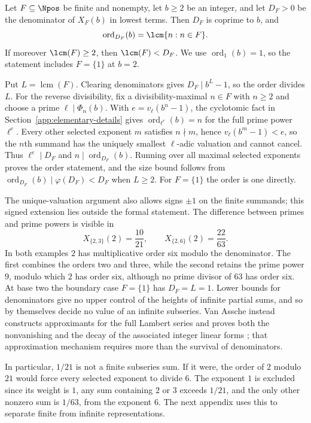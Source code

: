 \documentclass[11pt]{article}
\begin{document}
\begin{theorem}\label{res:period}
Let $F\subseteq\Npos$ be finite and nonempty, let $b\ge2$ be an integer, and
let $D_F>0$ be the denominator of $X_F(b)$ in lowest terms.  Then $D_F$ is
coprime to $b$, and
\[
  \operatorname{ord}_{D_F}(b)=\lcm\{n:n\in F\}.
\]
If moreover $\lcm(F)\ge2$, then $\lcm(F)<D_F$.  We use
$\operatorname{ord}_1(b)=1$, so the statement includes $F=\{1\}$
at $b=2$.
\end{theorem}

Put $L=\operatorname{lcm}(F)$. Clearing denominators gives
$D_F\mid b^L-1$, so the order divides $L$. For the reverse divisibility,
fix a divisibility-maximal $n\in F$ with $n\ge2$ and choose a prime
$\ell\mid\Phi_n(b)$. With $e=v_\ell(b^n-1)$, the cyclotomic fact in
Section~\ref{app:elementary-details} gives
$\operatorname{ord}_{\ell^e}(b)=n$ for the full prime power $\ell^e$.
Every other selected exponent $m$ satisfies $n\nmid m$, hence
$v_\ell(b^m-1)<e$, so the $n$th summand has the uniquely smallest
$\ell$-adic valuation and cannot cancel. Thus $\ell^e\mid D_F$ and
$n\mid\operatorname{ord}_{D_F}(b)$. Running over all maximal selected
exponents proves the order statement, and the size bound follows from
$\operatorname{ord}_{D_F}(b)\mid\varphi(D_F)<D_F$ when $L\ge2$. For
$F=\{1\}$ the order is one directly.

The unique-valuation argument also allows signs $\pm1$ on the finite
summands; this signed extension lies outside the formal statement. The
difference between primes and prime powers is visible in
\[
 X_{\{2,3\}}(2)=\frac{10}{21},\qquad
 X_{\{2,6\}}(2)=\frac{22}{63}.
\]
In both examples $2$ has multiplicative order six modulo the
denominator. The first combines the orders two and three, while the
second retains the prime power $9$, modulo which $2$ has order six,
although no prime divisor of $63$ has order six. At base two the
boundary case $F=\{1\}$ has $D_F=L=1$. Lower bounds for denominators
give no upper control of the heights of infinite partial sums, and so
by themselves decide no value of an infinite subseries. Van Assche
instead constructs approximants for the full Lambert series and proves
both the nonvanishing and the decay of the associated integer linear
forms \cite[Lemma~1 and (34)--(35)]{vanassche2001}; that approximation
mechanism requires more than the survival of denominators.


In particular, $1/21$ is not a finite subseries sum. If it were, the
order of $2$ modulo $21$ would force every selected exponent to divide
$6$. The exponent $1$ is excluded since its weight is $1$, any sum
containing $2$ or $3$ exceeds $1/21$, and the only other nonzero sum is
$1/63$, from the exponent $6$. The next appendix uses this to separate
finite from infinite representations.
\end{document}
